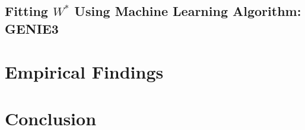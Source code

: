 \documentclass[12pt,letterpaper]{article}
\begin{document}
\subsection{Fitting $W^*$ Using Machine Learning Algorithm: GENIE3}


\section{Empirical Findings}


% 

% 

\section{Conclusion}


\clearpage 
\end{document}
